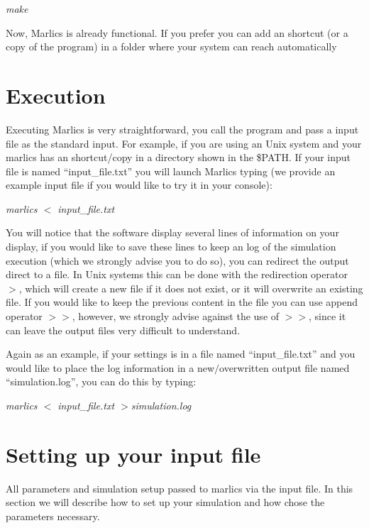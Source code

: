 \documentclass{article}
\newcommand{\consoleline}[2][0.5cm]
{\vspace{#1}
\textit{{#2}}
\vspace{#1}
}
\begin{document}
\consoleline{make}

Now, Marlics is already functional. If you prefer you can add an shortcut (or a copy of the program) in a folder where your system can reach automatically
\section{Execution}

Executing Marlics is very straightforward, you call the program and pass a input file as the standard input. For example, if you are using an Unix system and your marlics has an shortcut/copy in a directory shown in the \$PATH. If your input file is named ``input\_file.txt'' you will launch Marlics typing (we provide an example input file if you would like to try it in your console):


\consoleline{marlics $<$ input\_file.txt}


You will notice that the software display several lines of information on your display, if you would like to save these lines to keep an log of the simulation execution (which we strongly advise you to do so), you can redirect the output direct to a file. In Unix systems this can be done with the redirection operator $>$, which will create a new file if it does not exist, or it will overwrite an existing file. If you would like to keep the previous content in the file you can use append operator $>>$, however, we strongly advise against the use of $>>$, since it can leave the output files very difficult to understand.

Again as an example, if your settings is in a file named ``input\_file.txt'' and you would like to place the log information in a new$/$overwritten  output file named ``simulation.log'', you can do this by typing:

\consoleline{marlics $<$ input\_file.txt $>$simulation.log}

\section{Setting up your input file}\label{sec:inputfile}

All parameters and simulation setup  passed to marlics via the input file. In this section we will describe how to set up your simulation and how chose the parameters necessary.
\end{document}
